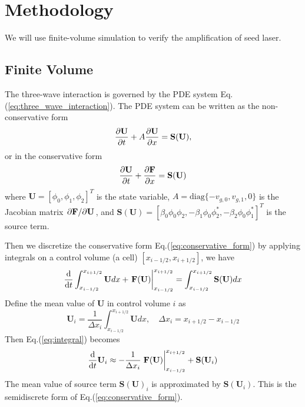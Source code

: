\documentclass{article}
\begin{document}
    \section{Methodology}
    We will use finite-volume simulation to verify the amplification of seed laser.
    \subsection{Finite Volume}
    The three-wave interaction is governed by the PDE system Eq.(\ref{eq:three_wave_interaction}). The PDE system can be written as the non-conservative form \cite{jardin_computational_2010}
    \begin{equation}
        \pdv{\mathbf{U}}{t} + A\pdv{\mathbf{U}}{x} = \mathbf{S(U)},
    \end{equation}
    or in the conservative form
    \begin{equation} \label{eq:conservative_form}
        \pdv{\mathbf{U}}{t} + \pdv{\mathbf{F}}{x} = \mathbf{S(U)}
    \end{equation}
    where $\mathbf{U} = [\phi_0, \phi_1, \phi_2]^T$ is the state variable, $A = \text{diag}\{ -v_{g,0}, v_{g,1}, 0 \}$ is the Jacobian matrix $\pdv*{\mathbf{F}}{\mathbf{U}}$, and $\mathbf{S(U)} = [\beta_0\phi_0\phi_2, -\beta_1\phi_0\phi_2^*, -\beta_2\phi_0\phi_1^*]^T$ is the source term.

    Then we discretize the conservative form Eq.(\ref{eq:conservative_form}) by applying integrals on a control volume (a cell) $[x_{i-1/2}, x_{i+1/2}]$, we have
    \begin{equation} \label{eq:integral}
        \dv{t} \int_{x_{i-1/2}}^{x_{i+1/2}}\mathbf{U}dx + \eval{\mathbf{F(U)}}_{x_{i-1/2}}^{x_{i+1/2}} = \int_{x_{i-1/2}}^{x_{i+1/2}}\mathbf{S(U)}dx
    \end{equation}
    Define the mean value of $\mathbf{U}$ in control volume $i$ as
    \begin{equation}
        \mathbf{U}_i = \frac{1}{\Delta x_i}\int_{x_{i-1/2}}^{x_{i+1/2}}\mathbf{U}dx, \quad \Delta x_i = x_{i+1/2} - x_{i-1/2}
    \end{equation} 
    Then Eq.(\ref{eq:integral}) becomes
    \begin{equation} \label{eq:semidiscrete}
        \dv{t}\mathbf{U}_i \approx -\frac{1}{\Delta x_i} \eval{\mathbf{F(U)}}_{x_{i-1/2}}^{x_{i+1/2}} + \mathbf{S}(\mathbf{U}_i)
    \end{equation}
    The mean value of source term $\mathbf{S(U)}_i$ is approximated by $\mathbf{S}(\mathbf{U}_i)$. This is the semidiscrete form of Eq.(\ref{eq:conservative_form}).
\end{document}

